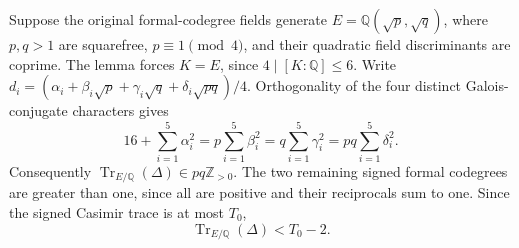 Suppose the original formal-codegree fields generate
$E=\mathbb Q(\sqrt p,\sqrt q)$, where $p,q>1$ are squarefree, $p\equiv1\pmod4$,
and their quadratic field discriminants are coprime.  The lemma forces
$K=E$, since $4\mid[K:\mathbb Q]\le6$.  Write
$d_i=(\alpha_i+\beta_i\sqrt p+\gamma_i\sqrt q+
\delta_i\sqrt{pq})/4$.  Orthogonality of the four distinct Galois-conjugate
characters gives
\[
16+\sum_{i=1}^5\alpha_i^2
=p\sum_{i=1}^5\beta_i^2
=q\sum_{i=1}^5\gamma_i^2
=pq\sum_{i=1}^5\delta_i^2.
\]
Consequently $\operatorname{Tr}_{E/\mathbb Q}(\Delta)\in pq\mathbb Z_{>0}$.
The two remaining signed formal codegrees are greater than one, since all
are positive and their reciprocals sum to one.  Since the signed Casimir
trace is at most $T_0$,
\begin{equation}\label{eq:biquadratic-trace-bound}
\operatorname{Tr}_{E/\mathbb Q}(\Delta)<T_0-2.
\end{equation}

